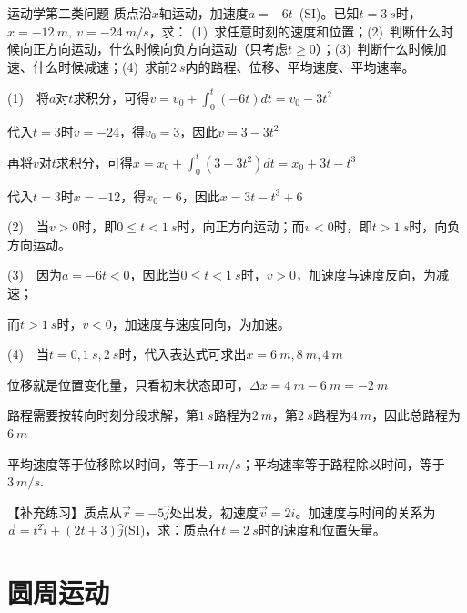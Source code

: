 \begin{example}{运动学第二类问题}
    质点沿$x$轴运动，加速度$a=-6t$~(SI)。已知$t=\SI{3}{s}$时，$x=\SI{-12}{m},~v=\SI{-24}{m/s}$，求： (1)~求任意时刻的速度和位置；(2)~判断什么时候向正方向运动，什么时候向负方向运动（只考虑$t\geq 0$）；(3)~判断什么时候加速、什么时候减速；(4)~求前$\SI{2}{s}$内的路程、位移、平均速度、平均速率。

    \tcblower

    (1)~~将$a$对$t$求积分，可得$v=v_0+\displaystyle \int_0^t{(-6t)dt}=v_0-3t^2$

    \vspace{0.25em}
    
    代入$t=3$时$v=-24$，得$v_0=3$，因此$v=3-3t^2$

    \vspace{0.25em}

    再将$v$对$t$求积分，可得$x=x_0+\displaystyle \int_0^t{(3-3t^2)dt}=x_0+3t-t^3$

    \vspace{0.25em}
    
    代入$t=3$时$x=-12$，得$x_0=6$，因此$x=3t-t^3+6$

    (2)~~当$v>0$时，即$0\leq t<\SI{1}{s}$时，向正方向运动；而$v<0$时，即$t>\SI{1}{s}$时，向负方向运动。

    (3)~~因为$a=-6t<0$，因此当$0\leq t<\SI{1}{s}$时，$v>0$，加速度与速度反向，为减速；
    
    而$t>\SI{1}{s}$时，$v<0$，加速度与速度同向，为加速。

    (4)~~当$t=0,\SI{1}{s},\SI{2}{s}$时，代入表达式可求出$x=\SI{6}{m},\SI{8}{m},\SI{4}{m}$

    位移就是位置变化量，只看初末状态即可，$\Delta x=\SI{4}{m}-\SI{6}{m}=\SI{-2}{m}$

    路程需要按转向时刻分段求解，第$\SI{1}{s}$路程为$\SI{2}{m}$，第$\SI{2}{s}$路程为$\SI{4}{m}$，因此总路程为$\SI{6}{m}$

    平均速度等于位移除以时间，等于$\SI{-1}{m/s}$；平均速率等于路程除以时间，等于$\SI{3}{m/s}$.

    \tcbline
    【补充练习】质点从$\vec{r}=−5\hat{j}$处出发，初速度$\vec{v}=2\hat{i}$。加速度与时间的关系为$\vec{a}=t^2\hat{i}+(2t+3)\hat{j}$(SI)，求：质点在$t=\SI{2}{s}$时的速度和位置矢量。
\end{example}

\section{圆周运动}


